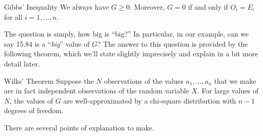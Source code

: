\documentclass[letterpaper]{article}
\begin{document}
\bigskip 

\begin{theorem}{Gibbs' Inequality}{}
    We always have $G \geq 0$. Moreover, $G = 0$ if and only if $O_i = E_i$ for all $i = 1, \hdots, n$. 
\end{theorem}
The question is simply, how big is ``big?'' In particular, in our example, can we say 15.84 is a ``\emph{big}'' value of $G$? The answer to this question is provided by the following theorem, which we'll state slightly imprecisely and explain in a bit more detail later. 

\begin{theorem}{Wilks' Theorem}{}
    Suppose the $N$ observations of the values $a_1, \hdots, a_n$ that we make are in fact independent observations of the random variable $X$. For large values of $N$, the values of $G$ are well-approximated by a chi-square distribution with $n - 1$ degrees of freedom.
\end{theorem}
There are several points of explanation to make.
\end{document}
